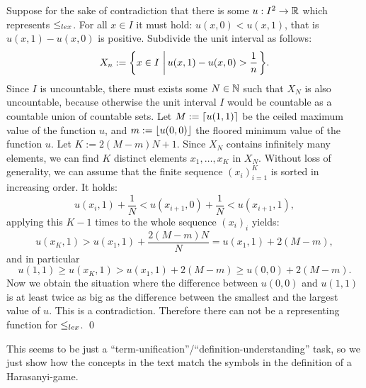 \documentclass{scrartcl}
\newcommand{\exercise}[2]{\vspace{1em}\noindent{\bf Exercise #1 (#2)}}
\begin{document}
Suppose for the sake of contradiction that there is some $u: I^2 \to \mathbb{R}$
which represents $\leq_{lex}$.
For all $x \in I$ it must hold: 
$u(x, 0) < u(x, 1)$, that is $u(x, 1) - u(x, 0)$ is positive.
Subdivide the unit interval as follows:
\[
  X_n := {\left\{x\in I\,\left\vert\, u(x, 1) - u(x, 0) > \frac{1}{n}\right.\right\}}.
\]
Since $I$ is uncountable, there must exists some $N\in \mathbb{N}$ such that
$X_N$ is also uncountable, because otherwise the unit interval $I$ would be
countable as a countable union of countable sets.
Let $M := {\left\lceil u(1,1)\right\rceil}$ be the ceiled maximum value of the function $u$,
and $m := {\left\lfloor u(0,0)\right\rfloor}$ the floored minimum value of the function $u$.
Let $K := 2(M-m)N + 1$.
Since $X_N$ contains infinitely many elements, we can find $K$ 
distinct elements $x_1, \dots, x_K$ in $X_N$. 
Without loss of generality, we can assume that the finite sequence 
$(x_i)_{i=1}^K$ is sorted in increasing order.
It holds:
\[
  u(x_i, 1) + \frac{1}{N} < u(x_{i+1}, 0) + \frac{1}{N} < u(x_{i+1}, 1),
\]
applying this $K-1$ times to the whole sequence $(x_i)_i$ yields:
\[
  u(x_K, 1) > u(x_1, 1) + \frac{2(M-m)N}{N} = u(x_1, 1) + 2(M-m),
\]
and in particular
\[
  u(1, 1) \geq u(x_K, 1) > u(x_1, 1) + 2(M-m) \geq u(0,0) + 2(M-m).
\]
Now we obtain the situation where the difference between $u(0,0)$ and
$u(1,1)$ is at least twice as big as the difference between the 
smallest and the largest value of $u$. This is a contradiction.
Therefore there can not be a representing function for $\leq_{lex}$. 
\hfill \qed

\exercise{7.3}{Harasanyi-Game}
This seems to be just a ``term-unification''/``definition-understanding'' 
task, so we just show how the concepts in the text match the symbols in
the definition of a Harasanyi-game.
\end{document}
